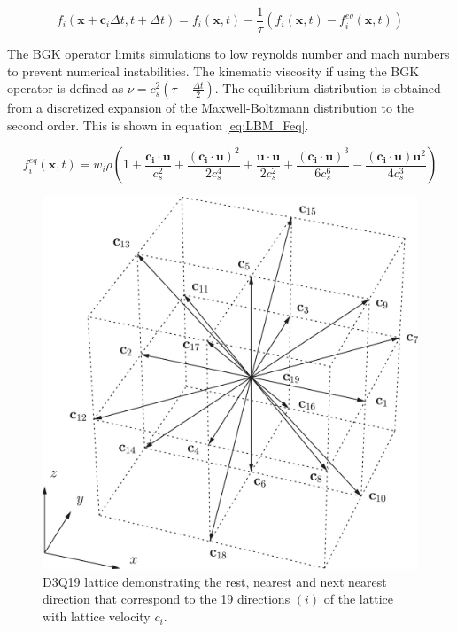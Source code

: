 \begin{equation}
    f_{i}(\mathbf{x} + \mathbf{c}_{i}\Delta t, t + \Delta t) = f_{i}(\mathbf{x}, t) - \frac{1}{\tau}(f_{i}(\mathbf{x}, t) - f_{i}^{eq}(\mathbf{x}, t))
    \label{eq:LBM_BGK}
\end{equation}

The BGK operator limits simulations to low reynolds number and mach numbers to prevent numerical instabilities. \cite{qian_lattice_1992} The kinematic viscosity if using the BGK operator is defined as $\nu = c_s^2(\tau - \frac{\Delta t}{2})$. The equilibrium distribution is obtained from a discretized expansion of the Maxwell-Boltzmann distribution to the second order. \cite{he_theory_1997, succi_lattice_2018} This is shown in equation \ref{eq:LBM_Feq}.

\begin{equation}
    f_{i}^{eq}(\mathbf{x}, t) = w_i\rho(1 + \frac{\mathbf{c_i} \cdot \mathbf{u}}{c_s^2} + \frac{(\mathbf{c_i} \cdot \mathbf{u})^2}{2c_s^4} + \frac{\mathbf{u} \cdot \mathbf{u}}{2c_s^2} + \frac{(\mathbf{c_i} \cdot \mathbf{u})^3}{6c_s^6} - \frac{(\mathbf{c_i} \cdot \mathbf{u})\mathbf{u}^2}{4c_s^3})
    \label{eq:LBM_Feq}
\end{equation}

\begin{figure}[h]
    \centering
    \includegraphics[scale = 0.7]{figures/methods/d3q19_lattice.jpg}
    \caption{D3Q19 lattice demonstrating the rest, nearest and next nearest direction that correspond to the 19 directions $(i)$ of the lattice with lattice velocity $c_{i}$.}
    \label{fig:d3q19_lattice}
\end{figure}

